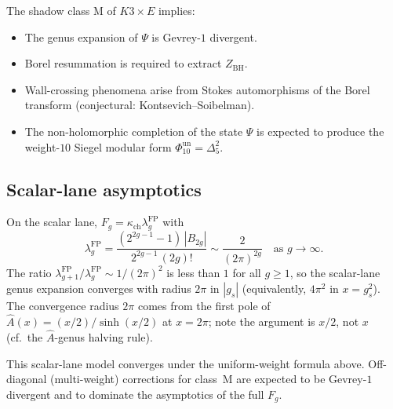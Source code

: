 \documentclass[11pt]{amsart}
\theoremstyle{plain}
\theoremstyle{definition}
\theoremstyle{remark}
\begin{document}
The shadow class M of $K3 \times E$ implies:
\begin{itemize}
 \item The genus expansion of $\Psi$ is Gevrey-$1$ divergent.
 \item Borel resummation is required to extract $Z_{\mathrm{BH}}$.
 \item Wall-crossing phenomena arise from Stokes automorphisms of the
       Borel transform (conjectural: Kontsevich--Soibelman).
 \item The non-holomorphic completion of the state $\Psi$ is expected to
       produce the weight-$10$ Siegel modular form
       $\Phi_{10}^{\mathrm{un}}=\Delta_5^2$.
\end{itemize}

\subsection{Scalar-lane asymptotics}
\label{sub:partition-function-asymptotics}

On the scalar lane, $F_g = \kappa_{\mathrm{ch}} \lambda_g^{\mathrm{FP}}$
with
\[
 \lambda_g^{\mathrm{FP}} = \frac{(2^{2g-1} - 1)\, |B_{2g}|}{2^{2g-1}\, (2g)!}
 \sim \frac{2}{(2\pi)^{2g}} \quad \text{as } g \to \infty.
\]
The ratio $\lambda_{g+1}^{\mathrm{FP}} / \lambda_g^{\mathrm{FP}}
\sim 1/(2\pi)^2$ is less than $1$ for all $g \geq 1$, so the
scalar-lane genus expansion converges with radius $2\pi$ in $|g_s|$
(equivalently, $4\pi^2$ in $x = g_s^2$). The convergence radius
$2\pi$ comes from the first pole of $\hat{A}(x) = (x/2)/\sinh(x/2)$
at $x = 2\pi$; note the argument is $x/2$, not $x$
(cf.\ the $\hat{A}$-genus halving rule).

This scalar-lane model converges under the uniform-weight formula above.
Off-diagonal (multi-weight) corrections for class~M are expected to be
Gevrey-$1$ divergent and to dominate the asymptotics of the full $F_g$.


\end{document}
